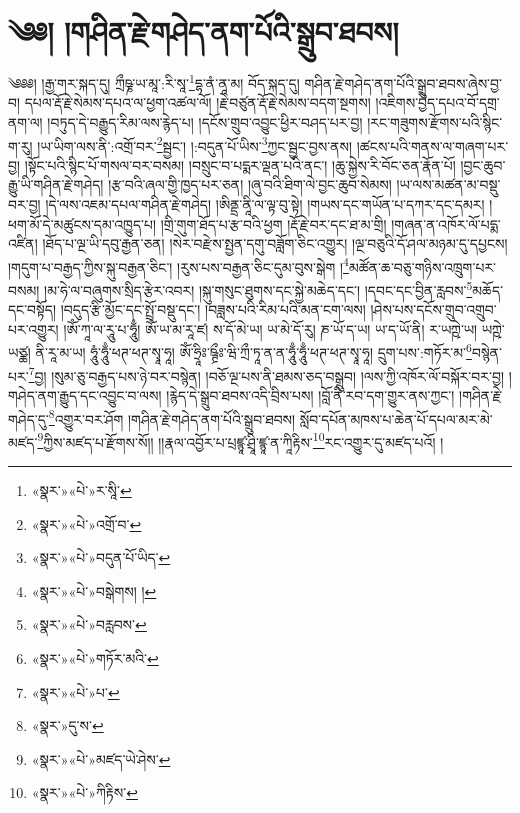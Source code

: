 \chapter{༄༅། །གཤིན་རྗེ་གཤེད་ནག་པོའི་སྒྲུབ་ཐབས།}༄༅༅། །རྒྱ་གར་སྐད་དུ། ཀྲྀཥྞ་ཡ་མཱ་:རི་སཱ་\footnote{«སྣར་»«པེ་»ར་སཱི་}དྷ་ནཾ་ནཱ་མ། བོད་སྐད་དུ། གཤིན་རྗེ་གཤེད་ནག་པོའི་སྒྲུབ་ཐབས་ཞེས་བྱ་བ། དཔལ་རྡོ་རྗེ་སེམས་དཔའ་ལ་ཕྱག་འཚལ་ལོ། །རྗེ་བཙུན་རྡོ་རྗེ་སེམས་བདག་སྔགས། །འཇིགས་བྱེད་དཔའ་བོ་དགྲ་ནག་ལ། །བཏུད་དེ་བརྒྱུད་རིམ་ལས་རྙེད་པ། །དངོས་གྲུབ་འབྱུང་ཕྱིར་བཤད་པར་བྱ། །རང་གཟུགས་རྫོགས་པའི་སྙིང་ག་རུ། །ཡ་ཡིག་ལས་ནི་:འགྲོ་བར་\footnote{«སྣར་»«པེ་»འགྲོ་བ་}སྦྱང་། །:བདུན་པོ་ཡིས་\footnote{«སྣར་»«པེ་»བདུན་པོ་ཡིད་}ཀྱང་སྦྱང་བྱས་ནས། །ཚངས་པའི་གནས་ལ་གཞག་པར་བྱ། །སྟོང་པའི་སྙིང་པོ་གསལ་བར་བསམ། །བསྲུང་བ་པདྨར་ལྡན་པའི་ནང་། །ཆུ་སྐྱེས་རི་བོང་ཅན་རྣོན་པོ། །བྱང་ཆུབ་རྒྱུ་ཡི་གཤིན་རྗེ་གཤེད། །རྩ་བའི་ཞལ་གྱི་ཁྱད་པར་ཅན། །ཞུ་བའི་ཐིག་ལེ་བྱང་ཆུབ་སེམས། །ཡ་ལས་མཚན་མ་བསྡུ་བར་བྱ། །དེ་ལས་འཇམ་དཔལ་གཤིན་རྗེ་གཤེད། །ཨིནྡྲ་ནཱི་ལ་ལྟ་བུ་སྟེ། །གཡས་དང་གཡོན་པ་དཀར་དང་དམར། །ཕག་མོ་དེ་མཚུངས་དམ་འཁྱུད་པ། །གྲི་གུག་ཐོད་པ་རྩ་བའི་ཕྱག །རྡོ་རྗེ་བར་དང་ཐ་མ་གྲི། །གཞན་ན་འཁོར་ལོ་པདྨ་འཛིན། །ཐོད་པ་ལྔ་ཡི་དབུ་རྒྱན་ཅན། །སེར་བརྫེས་སྤྱན་དགུ་བཟློག་ཅིང་འགྱུར། །ལྔ་བཅུའི་དོ་ཤལ་མཉམ་དུ་དཔྱངས། །གདུག་པ་བརྒྱད་ཀྱིས་སྐུ་བརྒྱན་ཅིང་། །རུས་པས་བརྒྱན་ཅིང་དུམ་བུས་སྒེག །\footnote{«སྣར་»«པེ་»བསྒེགས། །}མཚོན་ཆ་བཅུ་གཉིས་འཁྲུག་པར་བསམ། །མ་ཧེ་ལ་བཞུགས་སྲིད་རྩེར་འབར། །སྐུ་གསུང་ཐུགས་དང་སྐྱེ་མཆེད་དང་། །དབང་དང་བྱིན་རླབས་\footnote{«སྣར་»«པེ་»བརླབས་}མཆོད་དང་བསྟོད། །བདུད་རྩི་མྱོང་དང་སྤྲོ་བསྡུ་དང་། །བཟླས་པའི་རིམ་པའི་མན་ངག་ལས། །ཤེས་པས་དངོས་གྲུབ་འགྲུབ་པར་འགྱུར། །ཨོཾ་ཀཱ་ལ་རཱུ་པ་ཧཱུྃ། ཨོཾ་ཡ་མ་རཱ་ཛ། ས་དོ་མེ་ཡ། ཡ་མེ་དོ་རུ། ཎ་ཡོ་ད་ཡ། ཡ་ད་ཡོ་ནི། ར་ཡཀྵེ་ཡ། ཡཀྵེ་ཡཙྪ། ནི་རཱ་མ་ཡ། ཧཱུཾ་ཧཱུྃ་ཕཊ་ཕཊ་སྭཱ་ཧཱ། ཨོཾ་ཧྲཱིཿ་ཥྚྲྀཿ་ཝི་ཀྲྀ་ཏཱ་ན་ན་ཧཱུྃ་ཧཱུྃ་ཕཊ་ཕཊ་སྭཱ་ཧཱ། དྲུག་པས་:གཏོར་མ་\footnote{«སྣར་»«པེ་»གཏོར་མའི་}བསྙེན་པར་\footnote{«སྣར་»«པེ་»པ་}བྱ། །སུམ་ཅུ་བརྒྱད་པས་ཉེ་བར་བསྙེན། །བཅོ་ལྔ་པས་ནི་ཐམས་ཅད་བསྒྲུབ། །ལས་ཀྱི་འཁོར་ལོ་བསྐོར་བར་བྱ། །གཤེད་ནག་རྒྱུད་དང་འབྱུང་བ་ལས། །རྙེད་དེ་སྒྲུབ་ཐབས་འདི་བྲིས་པས། །བློ་ནི་རབ་དག་གྱུར་ནས་ཀྱང་། །གཤིན་རྗེ་གཤེད་དུ་\footnote{«སྣར་»དུ་ས་}འགྱུར་བར་ཤོག །གཤིན་རྗེ་གཤེད་ནག་པོའི་སྒྲུབ་ཐབས། སློབ་དཔོན་མཁས་པ་ཆེན་པོ་དཔལ་མར་མེ་མཛད་\footnote{«སྣར་»«པེ་»མཛད་ཡེ་ཤེས་}ཀྱིས་མཛད་པ་རྫོགས་སོ།། །།རྣལ་འབྱོར་པ་པྲཛྙཱ་ཤྲཱི་ཛྙཱ་ན་ཀཱིརྟིས་\footnote{«སྣར་»«པེ་»ཀིརྟིས་}རང་འགྱུར་དུ་མཛད་པའོ། ། 